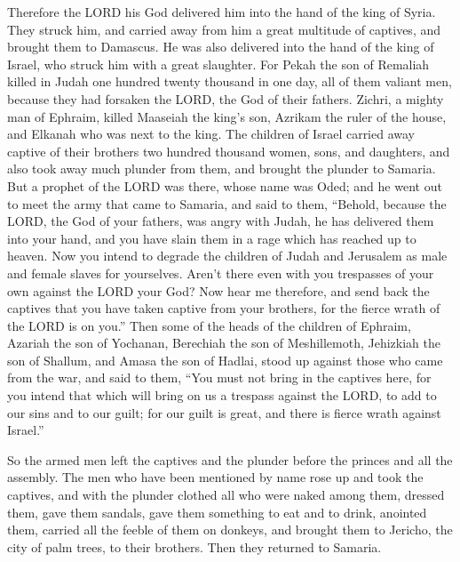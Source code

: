 \myverse{}Therefore the LORD his God delivered him into the hand of the
king of Syria. They struck him, and carried away from him a great multitude of captives, and brought them
to Damascus. He was also delivered into the hand of the king of Israel, who struck him with a great slaughter.
\myverse{}For Pekah the son of Remaliah killed in Judah one hundred twenty thousand in
one day, all of them valiant men, because they had forsaken the LORD, the God of their fathers.
\myverse{}Zichri, a mighty man of Ephraim, killed Maaseiah the king’s son, Azrikam the
ruler of the house, and Elkanah who was next to the king.
\myverse{}The children of Israel carried away captive of their brothers two hundred thousand
women, sons, and daughters, and also took away much plunder from them, and brought the plunder to Samaria.
\myverse{}But a prophet of the LORD was there, whose name was Oded; and he went out to
meet the army that came to Samaria, and said to them, “Behold, because the LORD, the God of your fathers,
was angry with Judah, he has delivered them into your hand, and you have slain them in a rage which has
reached up to heaven.
\myverse{}Now you intend to degrade the children of Judah and Jerusalem as male and
female slaves for yourselves. Aren’t there even with you trespasses of your own against the LORD your
God?
\myverse{}Now hear me therefore, and send back the captives that you have taken captive
from your brothers, for the fierce wrath of the LORD is on you.”
\myverse{}Then some of the heads of the children of Ephraim, Azariah the son of Yochanan,
Berechiah the son of Meshillemoth, Jehizkiah the son of Shallum, and Amasa the son of Hadlai, stood up
against those who came from the war,
\myverse{}and said to them, “You must not bring in the captives here, for you intend
that which will bring on us a trespass against the LORD, to add to our sins and to our guilt; for our
guilt is great, and there is fierce wrath against Israel.”

\myverse{}So the armed men left the captives and the plunder before the
princes and all the assembly.
\myverse{}The men who have been mentioned by name rose up and took the captives, and
with the plunder clothed all who were naked among them, dressed them, gave them sandals, gave them something
to eat and to drink, anointed them, carried all the feeble of them on donkeys, and brought them to Jericho,
the city of palm trees, to their brothers. Then they returned to Samaria.

